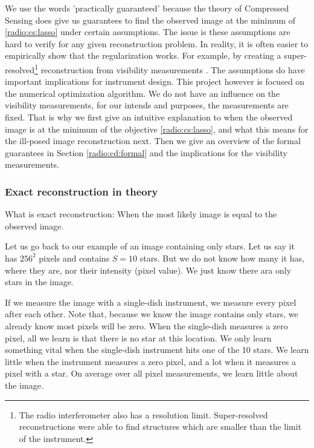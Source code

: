 We use the words 'practically guaranteed' because the theory of Compressed Sensing does give us guarantees to find the observed image at the minimum of \eqref{radio:cs:lasso} under certain assumptions. The issue is these assumptions are hard to verify for any given reconstruction problem. In reality, it is often easier to empirically show that the regularization works. For example, by creating a super-resolved\footnote{The radio interferometer also has a resolution limit. Super-resolved reconstructions were able to find structures which are smaller than the limit of the instrument.} reconstruction from visibility measurements \cite{dabbech2018cygnus}. The assumptions do have important implications for instrument design. This project however is focused on the numerical optimization algorithm. We do not have an influence on the visibility measurements, for our intends and purposes, the measurements are fixed. That is why we first give an intuitive explanation to when the observed image is at the minimum of the objective \eqref{radio:cs:lasso}, and what this means for the ill-posed image reconstruction next. Then we give an overview of the formal guarantees in Section \ref{radio:cd:formal} and the implications for the visibility measurements.


\subsubsection{Exact reconstruction in theory}\label{radio:cd:intuitive}
What is exact reconstruction: When the most likely image is equal to the observed image. 

Let us go back to our example of an image containing only stars. Let us say it has $256^2$ pixels and contains $S = 10$ stars. But we do not know how many it has, where they are, nor their intensity (pixel value). We just know there ara only stars in the image. 

If we measure the image with a single-dish instrument, we measure every pixel after each other. Note that, because we know the image contains only stars, we already know most pixels will be zero. When the single-dish measures a zero pixel, all we learn is that there is no star at this location. We only learn something vital when the single-dish instrument hits one of the 10 stars. We learn little when the instrument measures a zero pixel, and a lot when it measures a pixel with a star. On average over all pixel measurements, we learn little about the image.


